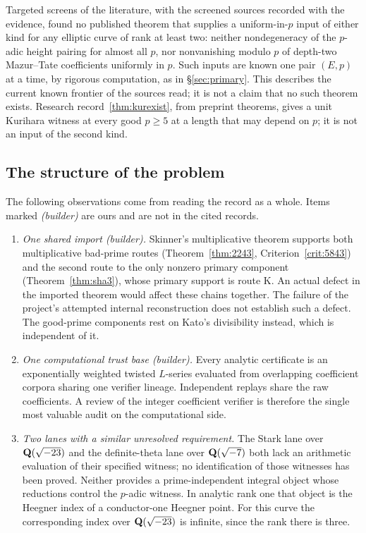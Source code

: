 Targeted screens of the literature, with the screened sources recorded with the evidence, found no published theorem that supplies a uniform-in-$p$ input of either kind for any elliptic curve of rank at least two: neither nondegeneracy of the $p$-adic height pairing for almost all $p$, nor nonvanishing modulo $p$ of depth-two Mazur--Tate coefficients uniformly in $p$. Such inputs are known one pair $(E,p)$ at a time, by rigorous computation, as in \S\ref{sec:primary}. This describes the current known frontier of the sources read; it is not a claim that no such theorem exists. Research record~\ref{thm:kurexist}, from preprint theorems, gives a unit Kurihara witness at every good $p\ge5$ at a length that may depend on $p$; it is not an input of the second kind.

\subsection{The structure of the problem}
The following observations come from reading the record as a whole. Items marked \emph{(builder)} are ours and are not in the cited records.

\begin{enumerate}[label=(\alph*),leftmargin=*]
\item \emph{One shared import (builder).} Skinner's multiplicative theorem supports both multiplicative bad-prime routes (Theorem~\ref{thm:2243}, Criterion~\ref{crit:5843}) and the second route to the only nonzero primary component (Theorem~\ref{thm:sha3}), whose primary support is route K. An actual defect in the imported theorem would affect these chains together. The failure of the project's attempted internal reconstruction does not establish such a defect. The good-prime components rest on Kato's divisibility instead, which is independent of it.

\item \emph{One computational trust base (builder).} Every analytic certificate is an exponentially weighted twisted $L$-series evaluated from overlapping coefficient corpora sharing one verifier lineage. Independent replays share the raw coefficients. A review of the integer coefficient verifier is therefore the single most valuable audit on the computational side.

\item \emph{Two lanes with a similar unresolved requirement.} The Stark lane over $\mathbf{Q}(\sqrt{-23})$ and the definite-theta lane over $\mathbf{Q}(\sqrt{-7})$ both lack an arithmetic evaluation of their specified witness; no identification of those witnesses has been proved. Neither provides a prime-independent integral object whose reductions control the $p$-adic witness. In analytic rank one that object is the Heegner index of a conductor-one Heegner point. For this curve the corresponding index over $\mathbf{Q}(\sqrt{-23})$ is infinite, since the rank there is three.
\end{enumerate}

